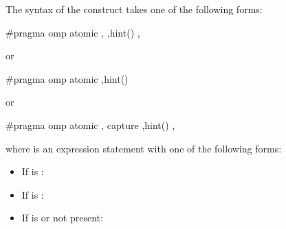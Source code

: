 \begin{ccppspecific}
The syntax of the  construct takes one of the following forms:

\begin{boxedcode}
\#pragma omp atomic \plc{[memory-order-clause[},\plc{]]}  
                   \plc{[[},\plc{]}hint()\plc{]} 
                   \plc{[[},\plc{]memory-order-clause]} 
\end{boxedcode}


or

\begin{boxedcode}
\#pragma omp atomic  \plc{[[},\plc{]}hint()\plc{]}  
\end{boxedcode}

or

\begin{boxedcode}
\#pragma omp atomic \plc{[memory-order-clause[},\plc{]]} capture 
                   \plc{[[},\plc{]}\plc{[}hint()\plc{]}
                   \plc{[[},\plc{]memory-order-clause]} 
\end{boxedcode}

where  is an expression statement with one of the following forms:

\begin{itemize}
\item If  is :\\

\item If  is :\\

\item If  is  or not present:\\
\\
\\
\\
\\
\\
\\


\end{itemize}
\end{ccppspecific}
